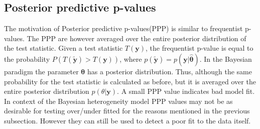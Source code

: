 \subsection{Posterior predictive p-values}
The motivation of Posterior predictive p-values(PPP) is similar to frequentist p-values. The PPP are however averaged over the entire posterior distribution of the test statistic. Given a test statistic $T(\boldsymbol{y})$, the frequentist p-value is equal to the probability $P(T(\boldsymbol{\tilde{y}}) > T(\boldsymbol{y}))$, where $p(\boldsymbol{\tilde{y}}) = p(\boldsymbol{y}|\boldsymbol{\hat{\theta}})$. In the Bayesian paradigm the parameter $\boldsymbol{\theta}$ has a posterior distribution. Thus, although the same probability for the test statistic is calculated as before, but it is averaged over the entire posterior distribution $p(\theta|\boldsymbol{y})$. A small PPP value indicates bad model fit. In context of the Bayesian heterogeneity model PPP values may not be as desirable for testing over/under fitted for the reasons mentioned in the previous subsection. However they can still be used to detect a poor fit to the data itself.
